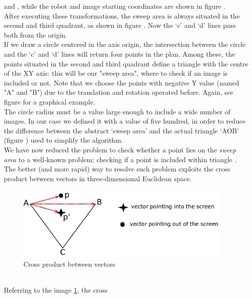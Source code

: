  and , 
while the robot and image starting coordinates are shown in 
figure .
\\
After executing these transformations, the sweep area is always 
situated in the second and third quadrant, as 
shown in figure . Now the `c' and `d' 
lines pass both from the origin.
\\
If we draw a circle centered in the axis origin, the intersection 
between the circle and the `c' and `d' lines will
return four points in the plan. Among these, the points situated 
in the second and third quadrant define a triangle
with the centre of the XY axis: this will be our "sweep area", 
where to check if an image is included or not. Note
that we choose the points with negative Y value (named "A" and "B") 
due to the translation and rotation operated
before. Again, see figure  
for a graphical example.
\\
The circle radius must be a value large enough to include a wide 
number of images. In our case we defined it with a
value of five hundred, in order to reduce the difference between 
the abstract `sweep area' and the actual triangle 
`AOB' (figure ) used to simplify the algorithm.
\\
We have now reduced the problem to check whether a point 
lies on the \textit{sweep area} to a well-known problem:
checking if a point is included within triangle
\cite{withinboundaries:pointintriangle}. 
The better (and more rapid) way to resolve such problem 
exploits the cross product between vectors
in three-dimensional Euclidean space.
\begin{figure}[!h]
  \begin{center}
    \includegraphics[width=300pt]{img/sweepal_crossproductABC.jpeg} 
    \caption{Cross product between vectors}
    \label{fig:sweepal_crossproductABC}
  \end{center}
\end{figure}
\\
Referring to the image \ref{fig:sweepal_crossproductABC}, the cross
